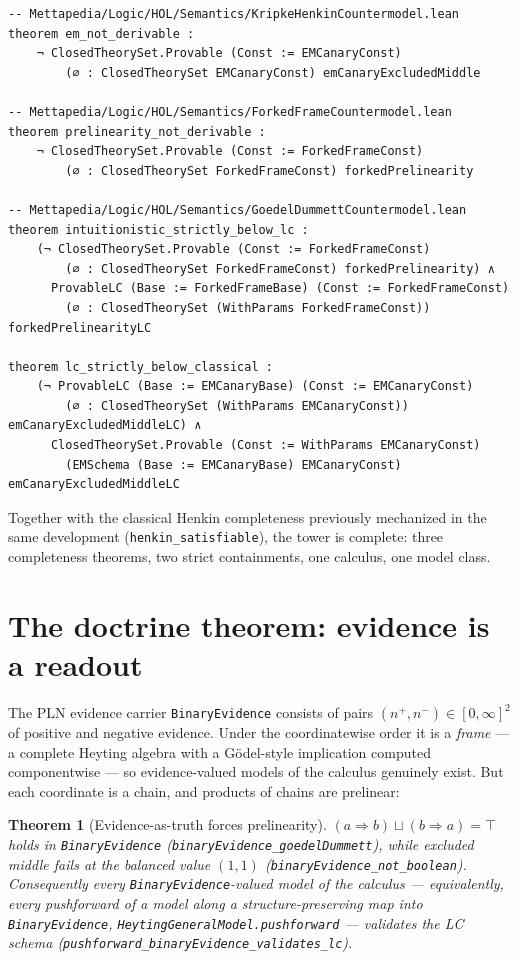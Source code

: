 \documentclass[11pt]{article}
\newcommand{\code}[1]{\texttt{#1}}
\newcommand{\BE}{\code{BinaryEvidence}}
\newcommand{\himp}{\Rightarrow}
\theoremstyle{plain}
\newtheorem{theorem}{Theorem}[section]
\theoremstyle{definition}
\begin{document}
\begin{lstlisting}
-- Mettapedia/Logic/HOL/Semantics/KripkeHenkinCountermodel.lean
theorem em_not_derivable :
    ¬ ClosedTheorySet.Provable (Const := EMCanaryConst)
        (∅ : ClosedTheorySet EMCanaryConst) emCanaryExcludedMiddle

-- Mettapedia/Logic/HOL/Semantics/ForkedFrameCountermodel.lean
theorem prelinearity_not_derivable :
    ¬ ClosedTheorySet.Provable (Const := ForkedFrameConst)
        (∅ : ClosedTheorySet ForkedFrameConst) forkedPrelinearity

-- Mettapedia/Logic/HOL/Semantics/GoedelDummettCountermodel.lean
theorem intuitionistic_strictly_below_lc :
    (¬ ClosedTheorySet.Provable (Const := ForkedFrameConst)
        (∅ : ClosedTheorySet ForkedFrameConst) forkedPrelinearity) ∧
      ProvableLC (Base := ForkedFrameBase) (Const := ForkedFrameConst)
        (∅ : ClosedTheorySet (WithParams ForkedFrameConst)) forkedPrelinearityLC

theorem lc_strictly_below_classical :
    (¬ ProvableLC (Base := EMCanaryBase) (Const := EMCanaryConst)
        (∅ : ClosedTheorySet (WithParams EMCanaryConst)) emCanaryExcludedMiddleLC) ∧
      ClosedTheorySet.Provable (Const := WithParams EMCanaryConst)
        (EMSchema (Base := EMCanaryBase) EMCanaryConst) emCanaryExcludedMiddleLC
\end{lstlisting}

Together with the classical Henkin completeness previously mechanized in the
same development (\code{henkin\_satisfiable}), the tower is complete: three
completeness theorems, two strict containments, one calculus, one model
class.

\section{The doctrine theorem: evidence is a readout}\label{sec:doctrine}

The PLN evidence carrier \BE{} consists of pairs
$(n^+,n^-)\in[0,\infty]^2$ of positive and negative evidence.  Under the
coordinatewise order it is a \emph{frame} --- a complete Heyting algebra with
a G\"odel-style implication computed componentwise --- so evidence-valued
models of the calculus genuinely exist.  But each coordinate is a chain, and
products of chains are prelinear:

\begin{theorem}[Evidence-as-truth forces prelinearity]
$(a\himp b)\sqcup(b\himp a)=\top$ holds in \BE{}
(\code{binaryEvidence\_goedelDummett}), while excluded middle fails at the
balanced value $(1,1)$ (\code{binaryEvidence\_not\_boolean}).  Consequently
every \BE{}-valued model of the calculus --- equivalently, every pushforward
of a model along a structure-preserving map into \BE{},
\code{HeytingGeneralModel.pushforward} --- validates the LC schema
(\code{pushforward\_binaryEvidence\_validates\_lc}).
\end{theorem}
\end{document}
